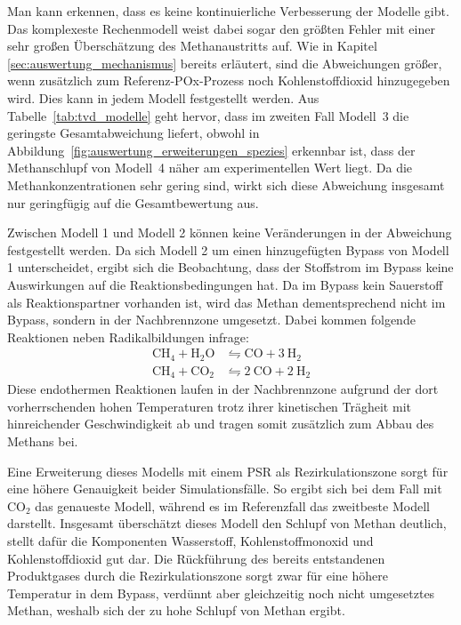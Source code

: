        Man kann erkennen, dass es keine kontinuierliche Verbesserung der Modelle gibt. Das komplexeste Rechenmodell weist dabei sogar den größten Fehler mit einer sehr großen Überschätzung des Methanaustritts auf. Wie in Kapitel \ref{sec:auswertung_mechanismus} bereits erläutert, sind die Abweichungen größer, wenn zusätzlich zum Referenz-POx-Prozess noch Kohlenstoffdioxid hinzugegeben wird. Dies kann in jedem Modell festgestellt werden. Aus Tabelle~\ref{tab:tvd_modelle} geht hervor, dass im zweiten Fall Modell~3 die geringste Gesamtabweichung liefert, obwohl in Abbildung~\ref{fig:auswertung_erweiterungen_spezies} erkennbar ist, dass der Methanschlupf von Modell~4 näher am experimentellen Wert liegt. Da die Methankonzentrationen sehr gering sind, wirkt sich diese Abweichung insgesamt nur geringfügig auf die Gesamtbewertung aus.

        Zwischen Modell 1 und Modell 2 können keine Veränderungen in der Abweichung festgestellt werden. Da sich Modell 2 um einen hinzugefügten Bypass von Modell 1 unterscheidet, ergibt sich die Beobachtung, dass der Stoffstrom im Bypass keine Auswirkungen auf die Reaktionsbedingungen hat. Da im Bypass kein Sauerstoff als Reaktionspartner vorhanden ist, wird das Methan dementsprechend nicht im Bypass, sondern in der Nachbrennzone umgesetzt. Dabei kommen folgende Reaktionen neben Radikalbildungen infrage:
        \begin{align}
            \mathrm{CH_4 + H_2O} & \leftrightharpoons\mathrm{ CO + 3\ H_2} \\ 
            \mathrm{CH_4 + CO_2} & \leftrightharpoons \mathrm{2\ CO +2\ H_2}
        \end{align}
        Diese endothermen Reaktionen laufen in der Nachbrennzone aufgrund der dort vorherrschenden hohen Temperaturen trotz ihrer kinetischen Trägheit mit hinreichender Geschwindigkeit ab und tragen somit zusätzlich zum Abbau des Methans bei.

        Eine Erweiterung dieses Modells mit einem PSR als Rezirkulationszone sorgt für eine höhere Genauigkeit beider Simulationsfälle. So ergibt sich bei dem Fall mit CO$_2$ das genaueste Modell, während es im Referenzfall das zweitbeste Modell darstellt. Insgesamt überschätzt dieses Modell den Schlupf von Methan deutlich, stellt dafür die Komponenten Wasserstoff, Kohlenstoffmonoxid und Kohlenstoffdioxid gut dar. Die Rückführung des bereits entstandenen Produktgases durch die Rezirkulationszone sorgt zwar für eine höhere Temperatur in dem Bypass, verdünnt aber gleichzeitig noch nicht umgesetztes Methan, weshalb sich der zu hohe Schlupf von Methan ergibt. 


